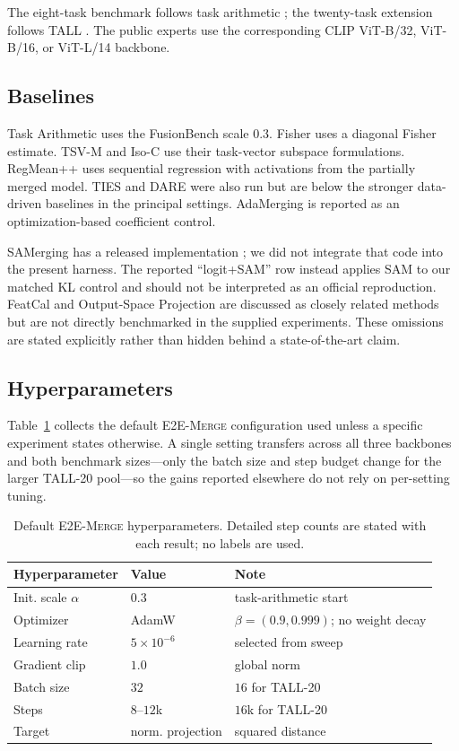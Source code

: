 \documentclass[letterpaper]{article} %
\newcommand{\method}{\textup{\textsc{E2E-Merge}}\xspace}
\theoremstyle{plain}
\theoremstyle{definition}
\begin{document}
The eight-task benchmark follows task arithmetic \citep{ilharco2023taskarithmetic}; the twenty-task extension follows TALL \citep{wang2024tall}.
The public experts use the corresponding CLIP ViT-B/32, ViT-B/16, or ViT-L/14 backbone.

\subsection{Baselines}
Task Arithmetic uses the FusionBench scale $0.3$.
Fisher uses a diagonal Fisher estimate.
TSV-M and Iso-C use their task-vector subspace formulations.
RegMean++ uses sequential regression with activations from the partially merged model.
TIES and DARE were also run but are below the stronger data-driven baselines in the principal settings.
AdaMerging is reported as an optimization-based coefficient control.

SAMerging has a released implementation \citep{samerging2025}; we did not integrate that code into the present harness.
The reported ``logit+SAM'' row instead applies SAM to our matched KL control and should not be interpreted as an official reproduction.
FeatCal and Output-Space Projection are discussed as closely related methods \citep{featcal2026,outputprojection2026} but are not directly benchmarked in the supplied experiments.
These omissions are stated explicitly rather than hidden behind a state-of-the-art claim.

\subsection{Hyperparameters}
Table~\ref{tab:hyperparameters} collects the default \method configuration used unless a specific experiment states otherwise.
A single setting transfers across all three backbones and both benchmark sizes---only the batch size and step budget change for the larger TALL-20 pool---so the gains reported elsewhere do not rely on per-setting tuning.

\begin{table}[tb]
\centering
{\small
\begin{tabular}{p{0.92in}p{0.72in}p{1.18in}}
\toprule
Hyperparameter & Value & Note \\
\midrule
Init. scale $\alpha$ & $0.3$ & task-arithmetic start \\
Optimizer & AdamW & $\beta=(0.9,0.999)$; no weight decay \\
Learning rate & $5\times10^{-6}$ & selected from sweep \\
Gradient clip & $1.0$ & global norm \\
Batch size & $32$ & $16$ for TALL-20 \\
Steps & $8$--$12$k & $16$k for TALL-20 \\
Target & norm. projection & squared distance \\
\bottomrule
\end{tabular}
}
\caption{Default \method hyperparameters. Detailed step counts are stated with each
result; no labels are used.}
\label{tab:hyperparameters}
\end{table}
\end{document}
